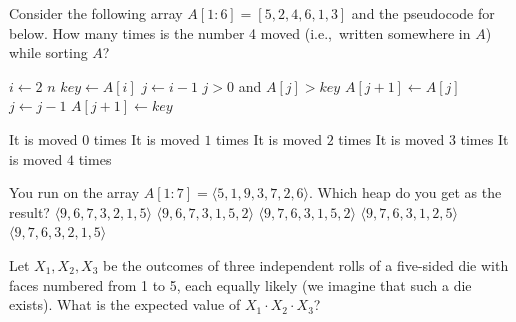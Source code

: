 Consider the following array \(A[1:6] = [5,2,4,6,1,3]\) and the pseudocode for  below.
How many times is the number 4 moved
(i.e.,~written somewhere in $A$) while sorting \(A\)?
\begin{codebox}
  \li \For $i \gets 2$ \To $n$ \Do
  \li $key \gets A[i]$
  \li $j \gets i-1$
  \li \While $j > 0$ and $A[j] > key$ \Do
  \li $A[j+1] \gets A[j]$
  \li $j \gets j-1$ \End
  \li $A[j+1] \gets key$
  \End
\end{codebox}
\oneanswer
\optionsstart
\answer It is moved \(0\) times
\answer It is moved \(1\) times
\answer It is moved \(2\) times
\answer It is moved \(3\) times \correct
\answer It is moved \(4\) times
\optionsend
{}


You run  on the array \(A[1:7] = \langle 5, 1, 9, 3, 7, 2, 6 \rangle\).
Which heap do you get as the result?
\oneanswer
\optionsstart
\answer \(\langle 9, 6, 7, 3, 2, 1, 5 \rangle\)
\answer \(\langle 9, 6, 7, 3, 1, 5, 2 \rangle\)
\answer \(\langle 9, 7, 6, 3, 1, 5, 2 \rangle\)
\answer \(\langle 9, 7, 6, 3, 1, 2, 5 \rangle\) \correct
\answer \(\langle 9, 7, 6, 3, 2, 1, 5 \rangle\)
\optionsend
{}
\pageshift

Let \(X_{1}, X_{2}, X_{3}\) be the outcomes of three independent rolls of a five-sided die with faces numbered from 1 to 5, each equally likely (we imagine that such a die exists).
What is the expected value of \(X_{1}\cdot X_{2}\cdot X_{3}\)?

